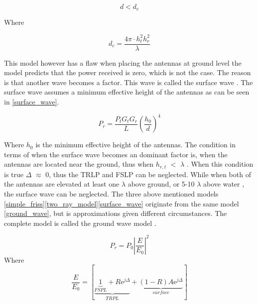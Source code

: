 


\begin{equation}
d < d_{c}
\label{two_ray_cond}
\end{equation}

Where %

\begin{equation}
d_{c} = \frac{4\pi \cdot h^2_t h^2_r }{\lambda}
\label{two_ray_cross_dis}
\end{equation}  

This model however has a flaw when placing the antennas at ground level the model predicts that the power received is zero, which is not the case. The reason is that another wave becomes a factor. This wave is called the surface wave \cite{Chong}. The surface wave assumes a minimum effective height of the antennas as can be seen in \eqref{surface_wave}. 

\begin{equation}
P_r=\frac{P_t G_t G_r }{L}\left(\frac{h_0}{d}\right)^4
\label{surface_wave}
\end{equation}

Where $h_0$ is the minimum effective height of the antennas. The condition in terms of when the surface wave becomes an dominant factor is, when the antennas are located near the ground, thus when $h_{r,t}$ $<$ $\lambda$ \cite{Chong}. When this condition is true $\Delta$ $\approx$ 0, thus the TRLP and FSLP can be neglected.    
While when both of the antennas are elevated at least one $\lambda$ above ground, or 5-10 $\lambda$ above water \cite{Chong}, the surface wave can be neglected. 
The three above mentioned models \eqref{simple_friss}\eqref{two_ray_model}\eqref{surface_wave} originate from the same model \eqref{ground_wave}, but is approximations given different circumstances. The complete model is called the ground wave model \cite{Chong,Bullington}. %


\begin{equation}
P_r=P_0 \left|\frac{E}{E_0}\right|^2 
\label{ground_wave}
\end{equation}
Where
\begin{equation}
\frac{E}{E_{0}}=[\underbrace{\underbrace{1}_{FSPL}+R\text{e}^{j\Delta}}_{TRPL}+\underbrace{(1-R)A\text{e}^{j\Delta}}_{surface}]
\label{ground_wave_EE0}
\end{equation}

